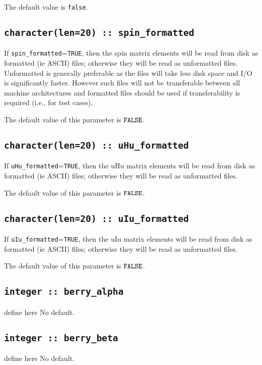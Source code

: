 The default value is \verb#false#.

\subsection[spin\_formated]{\tt character(len=20) :: spin\_formatted}

If \verb#spin_formatted#=\verb#TRUE#, then the spin matrix elements will be
read from disk as formatted (ie ASCII) files; otherwise they will be
read as unformatted files. Unformatted is generally preferable as the
files will take less disk space and I/O is significantly
faster. However such files will not be transferable between all
machine architectures and formatted files should be used if
transferability is required (i.e., for test cases).

The default value of this parameter is $\verb#FALSE#$.

\subsection[uHu\_formated]{\tt character(len=20) :: uHu\_formatted}

If \verb#uHu_formatted#=\verb#TRUE#, then the uHu matrix elements will be
read from disk as formatted (ie ASCII) files; otherwise they will be
read as unformatted files.

The default value of this parameter is $\verb#FALSE#$.

\subsection[uIu\_formated]{\tt character(len=20) :: uIu\_formatted}

If \verb#uIu_formatted#=\verb#TRUE#, then the uIu matrix elements will be
read from disk as formatted (ie ASCII) files; otherwise they will be
read as unformatted files.

The default value of this parameter is $\verb#FALSE#$.

\subsection[berry\_alpha]{\tt integer :: berry\_alpha}
define here
No default.

\subsection[berry\_alpha]{\tt integer :: berry\_beta}
define here
No default.




